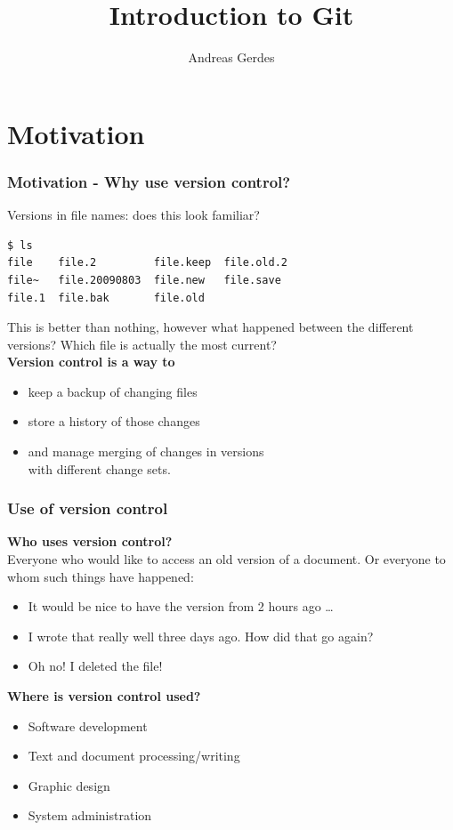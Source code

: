 \documentclass[handout,notes]{gittalk}
\title{Introduction to Git}
\author{Andreas Gerdes}
\date{}
\begin{document}

\begin{frame}
  \titlepage
\end{frame}

\section*{Motivation}

\begin{frame}[fragile]
\frametitle{Motivation - Why use version control?}
Versions in file names: does this look familiar?
\begin{lstlisting}
$ ls
file    file.2         file.keep  file.old.2
file~   file.20090803  file.new   file.save
file.1  file.bak       file.old
\end{lstlisting}
This is better than nothing, however what happened between the different
versions?  Which file is actually the most current?\\[1em]
\textbf{Version control is a way to}
\begin{itemize}
  \item keep a backup of changing files
  \item store a history of those changes
  \item and manage merging of changes in versions\\
        with different change sets.
\end{itemize}
\end{frame}

\begin{frame}
\frametitle{Use of version control}
\textbf{Who uses version control?}\\[0.5em]
Everyone who would like to access an old version of a document.  Or everyone
to whom such things have happened:
\begin{itemize}
    \item It would be nice to have the version from 2 hours ago \ldots
    \item I wrote that really well three days ago.  How did that go
        again?
    \item Oh no!  I deleted the file!
\end{itemize}
\vspace*{1em}
\textbf{Where is version control used?}\\[0.5em]
\begin{itemize}
\item Software development
\item Text and document processing/writing
\item Graphic design
\item System administration
\end{itemize}
\end{frame}
\end{document}
